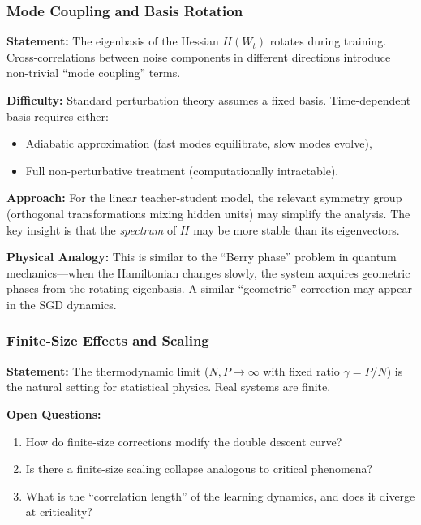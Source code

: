 \documentclass[
  journal=largetwo,
  year=2025,
  volume=37,
]{cup-journal}
\begin{document}
\subsubsection{Mode Coupling and Basis Rotation}

\textbf{Statement:} The eigenbasis of the Hessian $H(W_t)$ rotates during training. Cross-correlations between noise components in different directions introduce non-trivial ``mode coupling'' terms.

\textbf{Difficulty:} Standard perturbation theory assumes a fixed basis. Time-dependent basis requires either:
\begin{itemize}
    \item Adiabatic approximation (fast modes equilibrate, slow modes evolve),
    \item Full non-perturbative treatment (computationally intractable).
\end{itemize}

\textbf{Approach:} For the linear teacher-student model, the relevant symmetry group (orthogonal transformations mixing hidden units) may simplify the analysis. The key insight is that the \textit{spectrum} of $H$ may be more stable than its eigenvectors.

\textbf{Physical Analogy:} This is similar to the ``Berry phase'' problem in quantum mechanics---when the Hamiltonian changes slowly, the system acquires geometric phases from the rotating eigenbasis. A similar ``geometric'' correction may appear in the SGD dynamics.

\subsubsection{Finite-Size Effects and Scaling}

\textbf{Statement:} The thermodynamic limit ($N, P \to \infty$ with fixed ratio $\gamma = P/N$) is the natural setting for statistical physics. Real systems are finite.

\textbf{Open Questions:}
\begin{enumerate}
    \item How do finite-size corrections modify the double descent curve?
    \item Is there a finite-size scaling collapse analogous to critical phenomena?
    \item What is the ``correlation length'' of the learning dynamics, and does it diverge at criticality?
\end{enumerate}
\end{document}
